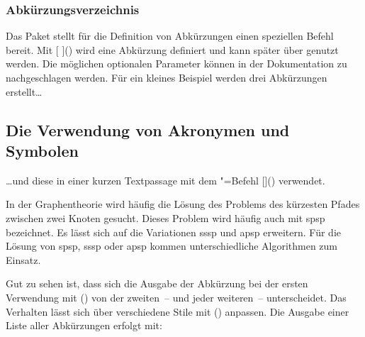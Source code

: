 \documentclass[%
  english,ngerman,%
  cdgeometry=no,DIV=12,automark%
]{tudscrartcl}
\begin{document}
\subsubsection{Abkürzungsverzeichnis}
Das Paket  stellt für die Definition von Abkürzungen einen 
speziellen Befehl bereit. Mit [%
  \LParameter{}%
]() wird eine Abkürzung definiert und kann später über 
 genutzt werden. Die möglichen optionalen Parameter können in 
der Dokumentation zu  nachgeschlagen werden. Für ein 
kleines Beispiel werden drei Abkürzungen erstellt\dots
%
\begin{Trunk+}
\section{Die Verwendung von Akronymen und Symbolen}
\end{Trunk+}
\begin{Trunk*}

\end{Trunk*}
%
\dots und diese in einer kurzen Textpassage mit dem "=Befehl
[]() verwendet.
%
\begin{Trunk*}
In der Graphentheorie wird häufig die Lösung des Problems des kürzesten
Pfades zwischen zwei Knoten gesucht. Dieses Problem wird häufig auch
mit \gls{spsp} bezeichnet. Es lässt sich auf die Variationen \gls{sssp}
und \gls{apsp} erweitern. Für die Lösung von \gls{spsp}, \gls{sssp} 
oder \gls{apsp} kommen unterschiedliche Algorithmen zum Einsatz.

\end{Trunk*}
%
Gut zu sehen ist, dass sich die Ausgabe der Abkürzung bei der ersten Verwendung 
mit () von der zweiten~-- und jeder weiteren~-- 
unterscheidet. Das Verhalten lässt sich über verschiedene Stile mit 
() anpassen. Die Ausgabe einer Liste 
aller Abkürzungen erfolgt mit:
%
\begin{Hint}
\printacronyms
\end{Hint}
\end{document}
